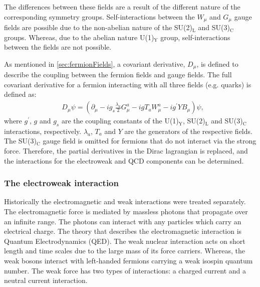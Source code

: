 The differences between these fields are a result of the different nature of the corresponding symmetry groups. Self-interactions between the $W_\mu$ and $G_\mu$ gauge fields are possible due to the non-abelian nature of the SU(2)$_\mathrm{L}$ and SU(3)$_\mathrm{C}$ groups. Whereas, due to the abelian nature U(1)$_\mathrm{Y}$ group, self-interactions between the fields are not possible.  

As mentioned in \cref{sec:fermionFields}, a covariant derivative, $D_\mu$, is defined to describe the coupling between the fermion fields and gauge fields. The full covariant derivative for a fermion interacting with all three fields (e.g. quarks) is defined as: 
\begin{equation}
    \label{eq:covaariantDerv}
    \begin{aligned}
        & D_\mu \psi = \left(\partial_\mu - ig_s\frac{\lambda_a}{2}G^a_\mu - igT_aW^a_\mu - ig^\prime YB_\mu\right)\psi,
    \end{aligned}
\end{equation}
where $g^\prime$, $g$ and $g_s$ are the coupling constants of the U(1)$_\mathrm{Y}$, SU(2)$_\mathrm{L}$ and SU(3)$_\mathrm{C}$ interactions, respectively. $\lambda_a$, $T_a$ and $Y$ are the generators of the respective fields. The SU(3)$_\mathrm{C}$ gauge field is omitted for fermions that do not interact via the strong force. Therefore, the partial derivatives in the Dirac lagrangian is replaced, and the interactions for the electroweak and QCD components can be determined. 

\subsubsection{The electroweak interaction}\label{sec:electroweak}
Historically the electromagnetic and weak interactions were treated separately. The electromagnetic force is mediated by massless photons that propagate over an infinite range. The photons can interact with any particles which carry an electrical charge. The theory that describes the electromagnetic interaction is Quantum Electrodynamics (QED). The weak nuclear interaction acts on short length and time scales due to the large mass of its force carriers. Whereas, the weak bosons interact with left-handed fermions carrying a weak isospin quantum number. The weak force has two types of interactions: a charged current and a neutral current interaction. 

